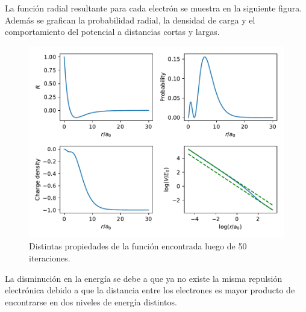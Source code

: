 \documentclass[paper=letter, fontsize=11pt]{scrartcl}
\begin{document}
La funci\'on radial resultante para cada electr\'on se muestra en la siguiente figura. Adem\'as se grafican la probabilidad radial, la densidad de carga y el comportamiento del potencial a distancias cortas y largas.
\begin{figure}[!h]
	\centering
	\includegraphics[width=0.7\linewidth]{complete.pdf}
	\caption{Distintas propiedades de la funci\'on encontrada luego de 50 iteraciones.}
\end{figure}

La disminuci\'on en la energ\'ia se debe a que ya no existe la misma repulsi\'on electr\'onica debido a que la distancia entre los electrones es mayor producto de encontrarse en dos niveles de energ\'ia distintos.
\end{document}
